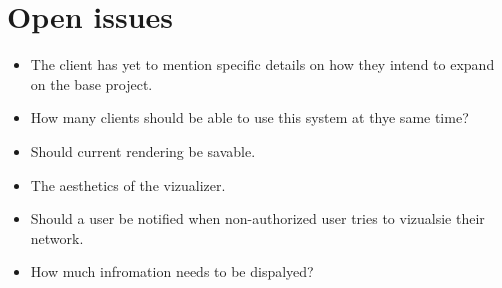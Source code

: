 \documentclass[a4paper,12pt]{report}
\begin{document}
\section{Open issues}
	\begin{itemize}
		\item The client has yet to mention specific details on how they intend to expand on the base project.
	\end{itemize}
	\begin{itemize}
		\item How many clients should be able to use this system at thye same time?
	\end{itemize}
	\begin{itemize}
		\item Should current rendering be savable. 
	\end{itemize}
	\begin{itemize}
		\item The aesthetics of the vizualizer.
	\end{itemize}
	\begin{itemize}
		\item Should a user be notified when non-authorized user tries to vizualsie their network.
	\end{itemize}
	\begin{itemize}
		\item How much infromation needs to be dispalyed?
	\end{itemize}
\end{document}
